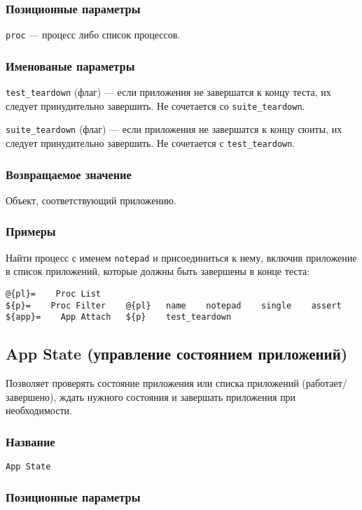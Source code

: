 \documentclass[11pt]{book} %
\begin{document}
\subsubsection*{Позиционные параметры} 

\verb"proc" --- процесс либо список процессов.

\subsubsection*{Именованые параметры} 
\verb"test_teardown" (флаг) --- если приложения не завершатся к концу теста, их следует принудительно завершить. Не сочетается со \verb"suite_teardown".

\verb"suite_teardown" (флаг) --- если приложения не завершатся к концу сюиты, их следует принудительно завершить. Не сочетается с \verb"test_teardown".

\subsubsection*{Возвращаемое значение} 
Объект, соответствующий приложению.

\subsubsection*{Примеры}
    Найти процесс с именем \verb"notepad" и присоединиться к нему, включив приложение в список приложений, которые должны быть завершены в конце теста:

\begin{verbatim}
@{pl}=    Proc List
${p}=    Proc Filter    @{pl}   name    notepad    single    assert
${app}=    App Attach   ${p}    test_teardown
\end{verbatim}



\subsection{App State (управление состоянием приложений)}
Позволяет проверять состояние приложения или списка приложений (работает/завершено), ждать нужного состояния и завершать приложения при необходимости. 


\subsubsection*{Название} 
\verb"App State"

\subsubsection*{Позиционные параметры} 
\end{document}
